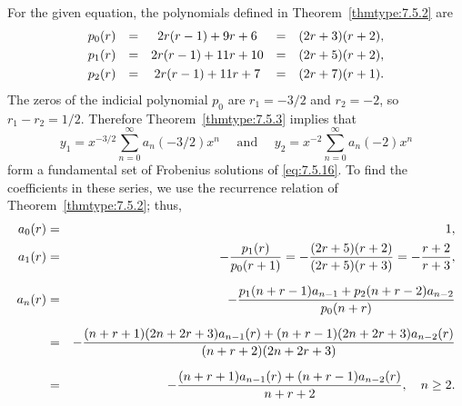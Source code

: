 \begin{examplesolution}
\solution For the given equation, the polynomials defined in Theorem~\ref{thmtype:7.5.2} are
\[
  \begin{array}{ccccc}
    p_{0}(r) & = & 2r(r-1)+9r+6   & = & (2r+3)(r+2), \\[1\jot]
    p_{1}(r) & = & 2r(r-1)+11r+10 & = & (2r+5)(r+2), \\[1\jot]
    p_{2}(r) & = & 2r(r-1)+11r+7  & = & (2r+7)(r+1).
  \end{array}
\]
The zeros of the indicial polynomial $p_{0}$ are $r_{1}=-3/2$ and $r_{2}=-2$, so $r_{1}-r_{2}=1/2$.
Therefore Theorem~\ref{thmtype:7.5.3} implies that
\begin{equation}
  \label{eq:7.5.17}y_{1}=x^{-3/2}\sum_{n=0}^{\infty}a_{n}(-3/2)x^{n}\quad\mbox{ and }\quad y_{2}=x^{-2}\sum_{n=0}^{\infty}a_{n}(-2)x^{n}
\end{equation}
form a fundamental set of Frobenius solutions of \eqref{eq:7.5.16}. To find the coefficients in
these series, we use the recurrence relation of Theorem~\ref{thmtype:7.5.2}; thus,
\begin{eqnarray*}
  a_{0}(r) & = & 1,                                                                                          \\
  a_{1}(r) & = & -\displaystyle\frac{p_{1}(r)}{p_{0}(r+1)}=-\displaystyle\frac{(2r+5)(r+2)}{(2r+5)(r+3)}=-\displaystyle\frac{r+2}{r+3}, \\[2\jot]
  a_{n}(r) & = & -\displaystyle\frac{p_{1}(n+r-1)a_{n-1}+p_{2}(n+r-2)a_{n-2}}{p_{0}(n+r)}                             \\[2\jot]
           & = & -\displaystyle\frac{(n+r+1)(2n+2r+3)a_{n-1}(r)+(n+r-1)(2n+2r+3)a_{n-2}(r)}{(n+r+2)(2n+2r+3)}         \\[2\jot]
           & = & -\displaystyle\frac{(n+r+1)a_{n-1}(r)+(n+r-1)a_{n-2}(r)}{n+r+2},\quad n\ge2.
\end{eqnarray*}


\end{examplesolution}
